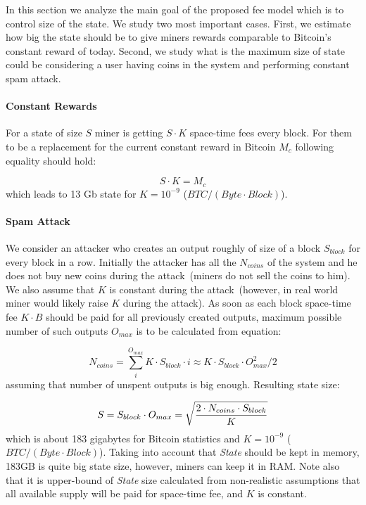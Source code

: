 \documentclass[]{llncs}   %
\newcommand{\authnote}[2]{\marginpar{\parbox{\marginparwidth}{\tiny %
  \textsf{#1 {\textcolor{blue}{notes: #2}}}}}%
  \textcolor{blue}{\textbf{\dag}}}
\newcommand{\authnote}[2]{
  \textsf{#1 \textcolor{blue}{: #2}}}
\newcommand{\authnote}[2]{}
\newcommand{\dnote}[1]{{\authnote{\textcolor{red}{Dima notes}}{#1}}}
\newcommand{\state}{\textit{State}}
\begin{document}
In this section we analyze the main goal of the proposed fee model which is to control size of the state. We study two most important cases. First, we estimate how big the state should be to give miners rewards comparable to Bitcoin's constant reward of today. Second, we study what is the maximum size of state could be considering a user having coins in the system and performing constant spam attack. \dnote{last sentense is not clean}

\paragraph{Constant Rewards}

For a state of size $S$ miner is getting $S \cdot K$ space-time fees every block. For them to be a replacement for the current constant reward in Bitcoin $M_c$ following equality should hold:

\begin{equation}
\label{eq:statesizeexp}
S \cdot K = M_c
\end{equation}
which leads to 13 Gb state for $K=10^{-9}$ ($BTC / (Byte \cdot Block)$).


\paragraph{Spam Attack}

We consider an attacker who creates an output roughly of size of a block $S_{block}$ for every block in a row. Initially the attacker has all the $N_{coins}$ of the system and he does not buy new coins during the attack~(miners do not sell the coins to him). We also assume that $K$ is constant during the attack~(however, in real world miner would likely raise $K$ during the attack). As soon as each block space-time fee $K \cdot B$ should be paid for all previously created outputs, maximum possible number of such outputs $O_{max}$ is to be calculated from equation:

\begin{equation}
N_{coins} = \sum_i^{O_{max}}{K \cdot S_{block} \cdot i} \approx K \cdot S_{block} \cdot O_{max}^2 / 2
\end{equation}
assuming that number of unspent outputs is big enough. Resulting state size: 

\begin{equation}
\label{eq:statesizemax}
S = S_{block} \cdot O_{max} = \sqrt { 2 \cdot N_{coins} \cdot S_{block} \over K}
\end{equation}
which is about 183 gigabytes for Bitcoin statistics and $K=10^{-9}$ ($BTC / (Byte \cdot Block)$). Taking into account that \state{} should be kept in memory, 183GB is quite big state size, however, miners can keep it in RAM. Note also that it is upper-bound of \state{} size calculated from non-realistic assumptions that all available supply will be paid for space-time fee, and $K$ is constant.
\end{document}
